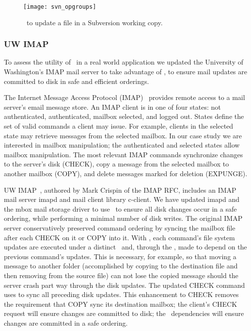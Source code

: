 \begin{figure}[htb]
  \centering
  \texttt{[image: svn\_opgroups]}
  \caption{\Opgroups\ to update a file in a Subversion working copy.}
  \label{fig:svn-order}
\end{figure}

\subsubsection{UW IMAP}
\label{sec:opgroup:uwimap}

To assess the utility of \opgroups\ in a real world application we
updated the University of Washington's IMAP mail server to take
advantage of \opgroups, to ensure mail updates are committed to disk
in safe and efficient orderings.

The Internet Message Access Protocol (IMAP)~\cite{rfc3501} provides
remote access to a mail server's email message store. An IMAP client
is in one of four states: not authenticated, authenticated, mailbox
selected, and logged out. States define the set of valid commands a
client may issue. For example, clients in the selected state may
retrieve messages from the selected mailbox. In our case study we are
interested in mailbox manipulation; the authenticated and selected
states allow mailbox manipulation. The most relevant IMAP commands
synchronize changes to the server's disk (CHECK), copy a message from
the selected mailbox to another mailbox (COPY), and delete messages
marked for deletion (EXPUNGE).

UW IMAP~\cite{uwimap}, authored by Mark Crispin of the IMAP RFC,
includes an IMAP mail server imapd and mail client library c-client.
We have updated imapd and the mbox mail storage driver to use
\opgroups\ to ensure all disk changes occur in a safe ordering, while
performing a minimal number of disk writes.
%
The original IMAP server conservatively preserved command ordering by
syncing the mailbox file after each CHECK on it or COPY into it. With
\opgroups, each command's file system updates are executed under a
distinct \opgroup\ and, through the \opgroup, made to depend on the
previous command's updates. This is necessary, for example, so that
moving a message to another folder (accomplished by copying to the
destination file and then removing from the source file) can not lose
the copied message should the server crash part way through the disk
updates.
%
The updated CHECK command uses \opgroupSync to sync all preceding disk
updates. This enhancement to CHECK removes the requirement that COPY
sync its destination mailbox; the client's CHECK request will ensure
changes are committed to disk; the \opgroup\ dependencies will ensure
changes are committed in a safe ordering.

